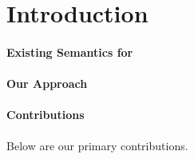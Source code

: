     \section{Introduction}
\label{sec:Intro}

\paragraph{Existing Semantics for \ISA}


\paragraph{Our Approach}


\paragraph{Contributions}

Below are our primary contributions.





